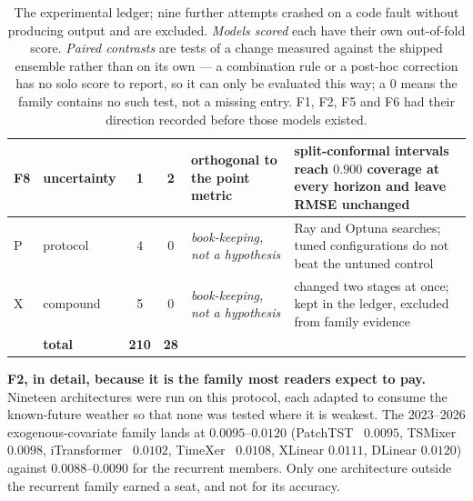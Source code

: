 \documentclass[10pt,letterpaper,twocolumn]{article}
\begin{document}
\begin{table}[!t]
\begin{tabular}{@{}llccL{4.55cm}L{5.25cm}@{}}
F8 & uncertainty & 1 & 2 & orthogonal to the point metric &
  split-conformal intervals reach $0.900$ coverage at every horizon and leave RMSE unchanged \\
\midrule
P & protocol & 4 & 0 & \emph{book-keeping, not a hypothesis} & Ray and Optuna searches; tuned configurations do not beat the untuned control \\
X & compound & 5 & 0 & \emph{book-keeping, not a hypothesis} & changed two stages at once; kept in the ledger, excluded from family evidence \\
\midrule
& \textbf{total} & \textbf{210} & \textbf{28} & & \\
\bottomrule
\end{tabular}
\caption{The experimental ledger; nine further attempts crashed on a code fault
without producing output and are excluded. \emph{Models scored} each have their
own out-of-fold score. \emph{Paired contrasts} are tests of a change measured
against the shipped ensemble rather than on its own --- a combination rule or a
post-hoc correction has no solo score to report, so it can only be evaluated
this way; a $0$ means the family contains no such test, not a missing entry.
F1, F2, F5 and F6 had their direction recorded before those models existed.}
\label{tab:fam}
\end{table}

\textbf{F2, in detail, because it is the family most readers expect to pay.}
Nineteen architectures were run on this protocol, each adapted to consume the
known-future weather so that none was tested where it is weakest. The
2023--2026 exogenous-covariate family lands at $0.0095$--$0.0120$
(PatchTST~\cite{nie} $0.0095$, TSMixer~\cite{tsmixer} $0.0098$,
iTransformer~\cite{liu} $0.0102$, TimeXer~\cite{timexer} $0.0108$,
XLinear $0.0111$, DLinear $0.0120$) against $0.0088$--$0.0090$ for the recurrent
members. Only one architecture outside the recurrent family earned a seat, and
not for its accuracy.
\end{document}
